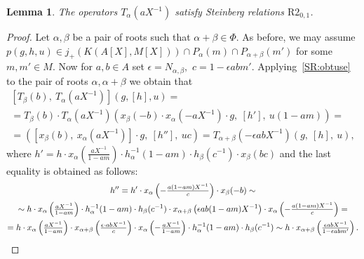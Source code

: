 \documentclass[oneside, 8pt]{amsart}
\newtheorem{lemma}{Lemma}
\theoremstyle{remark}
\theoremstyle{definition}
\numberwithin{lemma}{section}
\numberwithin{prop}{section}
\numberwithin{corollary}{section}
\numberwithin{externaltheorem}{section}
\numberwithin{equation}{section}
\begin{document}
\begin{lemma} \label{R2_0_1} The operators $T_\alpha(aX^{-1})$ satisfy Steinberg relations $\mathrm{R2}_{0,1}$. \end{lemma}
\begin{proof} 
Let $\alpha, \beta$ be a pair of roots such that $\alpha + \beta \in \Phi$.
As before, we may assume $p(g, h, u) \in j_+\left(K(A[X], M[X])\right) \cap P_\alpha(m) \cap P_{\alpha + \beta}(m')$ for some $m, m' \in M$.
Now for $a, b \in A$ set $\epsilon = N_{\alpha, \beta},$ $c = 1 - \epsilon abm'$.
Applying~\cref{SR:obtuse} to the pair of roots $\alpha, \alpha+\beta$ we obtain that 
\begin{multline} \nonumber
[T_\beta(b),\ T_\alpha(aX^{-1})] \left(g, [h], u \right) = \\
 = T_\beta(b) \cdot T_\alpha(aX^{-1}) \left(x_\beta(-b) \cdot x_\alpha (-a X^{-1})\cdot  g,\ [h'],\ u (1 - am) \right) = \\
 = \left([x_\beta(b),\ x_\alpha(aX^{-1})]\cdot g,\ [h''],\ u c\right) = T_{\alpha+\beta}(-\epsilon abX^{-1})(g,\ [h],\ u),\end{multline} 
 where $h' = h\cdot x_\alpha\left(\tfrac{a X^{-1}}{1-am}\right) \cdot h_{\alpha}^{-1}(1-am)\cdot h_{\beta}(c^{-1}) \cdot x_{\beta}(bc)$  
  and the last equality is obtained as follows:
 \begin{multline} \nonumber
 h'' = h' \cdot x_\alpha\left(-\tfrac{a(1 - am)X^{-1}}{c}\right) \cdot x_\beta(-b) \sim \\ \sim  h\cdot x_\alpha\left(\tfrac{a X^{-1}}{1-am}\right) \cdot h_{\alpha}^{-1}(1-am)\cdot h_{\beta}(c^{-1})\cdot x_{\alpha + \beta}\left(\epsilon ab(1-am)X^{-1}\right)\cdot x_\alpha\left(-\tfrac{a(1 - am)X^{-1}}{c}\right) = \\
 = h\cdot x_\alpha\left(\tfrac{a X^{-1}}{1-am}\right) \cdot x_{\alpha + \beta}\left(\tfrac{\epsilon \cdot abX^{-1}}{c}\right)\cdot x_\alpha\left(-\tfrac{aX^{-1}}{1 - am}\right) \cdot h_{\alpha}^{-1}(1-am)\cdot h_{\beta}(c^{-1}) \sim h\cdot x_{\alpha + \beta}\left(\tfrac{\epsilon   abX^{-1}}{1 - \epsilon a b m'}\right). \qedhere
\end{multline}
\end{proof}
\end{document}
